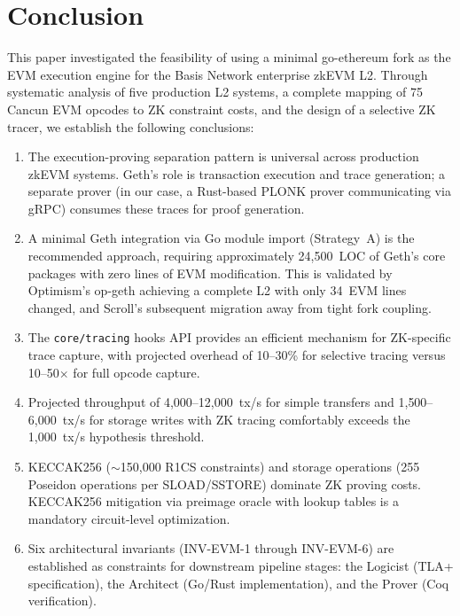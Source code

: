 
\section{Conclusion}

This paper investigated the feasibility of using a minimal go-ethereum fork as
the EVM execution engine for the Basis Network enterprise zkEVM L2. Through
systematic analysis of five production L2 systems, a complete mapping of 75
Cancun EVM opcodes to ZK constraint costs, and the design of a selective ZK
tracer, we establish the following conclusions:

\begin{enumerate}
  \item The execution-proving separation pattern is universal across production
    zkEVM systems. Geth's role is transaction execution and trace generation;
    a separate prover (in our case, a Rust-based PLONK prover communicating
    via gRPC) consumes these traces for proof generation.

  \item A minimal Geth integration via Go module import (Strategy~A) is the
    recommended approach, requiring approximately 24{,}500~LOC of Geth's core
    packages with zero lines of EVM modification. This is validated by
    Optimism's op-geth achieving a complete L2 with only 34~EVM lines changed,
    and Scroll's subsequent migration away from tight fork coupling.

  \item The \texttt{core/tracing} hooks API provides an efficient mechanism
    for ZK-specific trace capture, with projected overhead of 10--30\% for
    selective tracing versus 10--50$\times$ for full opcode capture.

  \item Projected throughput of 4{,}000--12{,}000~tx/s for simple transfers
    and 1{,}500--6{,}000~tx/s for storage writes with ZK tracing comfortably
    exceeds the 1{,}000~tx/s hypothesis threshold.

  \item KECCAK256 (${\sim}$150{,}000 R1CS constraints) and storage operations
    (255 Poseidon operations per SLOAD/SSTORE) dominate ZK proving costs.
    KECCAK256 mitigation via preimage oracle with lookup tables is a mandatory
    circuit-level optimization.

  \item Six architectural invariants (INV-EVM-1 through INV-EVM-6) are
    established as constraints for downstream pipeline stages: the Logicist
    (TLA+ specification), the Architect (Go/Rust implementation), and the
    Prover (Coq verification).
\end{enumerate}

